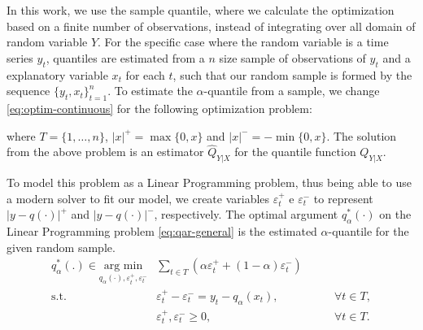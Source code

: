 
In this work, we use the sample quantile,  where we calculate the optimization based on a finite number of observations, instead of integrating over all domain of random variable $Y$. For the specific case where the random variable is a time series $y_t$, quantiles are estimated from a $n$ size sample of observations of $y_t$ and a explanatory variable $x_t$ for each $t$, such that our random sample is formed by the sequence $\{y_t,x_t \}_{t=1}^n$. To estimate the $\alpha$-quantile from a sample, we change \ref{eq:optim-continuous} for the following optimization problem:

where $T = \{1, \dots, n \}$, $|x|^+=\max\{0,x\}$ and $|x|^-=-\min\{0,x\}$. The solution from the above problem is an estimator $\hat{Q}_{Y|X}$ for the quantile function $Q_{Y|X}$.

To model this problem as a Linear Programming problem, thus being able to use a modern solver to fit our model,  we create variables $\varepsilon^+_t$ e $\varepsilon^-_t$ to represent $|y-q(\cdot)|^+$ and $|y-q(\cdot)|^-$, respectively. The optimal argument $q_\alpha^*(\cdot)$ on the Linear Programming problem \ref{eq:qar-general} is the estimated $\alpha$-quantile for the given random sample.
\begin{equation}
\begin{aligned}q^*_\alpha(.) \in \underset{q_\alpha (\cdot),\varepsilon_{t}^{+}, \varepsilon_{t}^{-}}{\text{arg min}} & \sum_{t \in T}\left(\alpha \varepsilon_{t}^{+}+(1-\alpha)\varepsilon_{t}^{-}\right) & \\
\mbox{s.t. } & \varepsilon_{t}^{+}-\varepsilon_{t}^{-}=y_{t}-q_\alpha(x_t), & \qquad\forall t \in T,\\
& \varepsilon_t^+,\varepsilon_t^- \geq 0, & \qquad \forall t \in T.
\end{aligned}
\label{eq:qar-general}
\end{equation}

